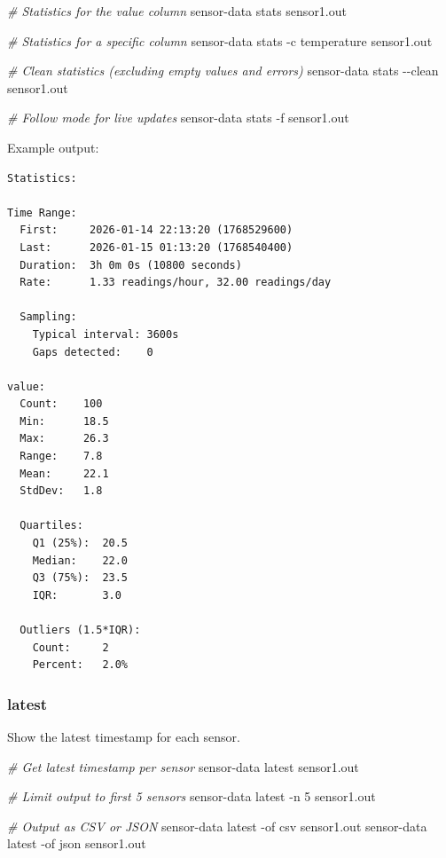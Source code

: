 \documentclass[
]{book}
\newenvironment{Shaded}{\begin{snugshade}}{\end{snugshade}}
\newcommand{\AttributeTok}[1]{\textcolor[rgb]{0.13,0.29,0.53}{#1}}
\newcommand{\CommentTok}[1]{\textcolor[rgb]{0.56,0.35,0.01}{\textit{#1}}}
\newcommand{\ExtensionTok}[1]{#1}
\newcommand{\NormalTok}[1]{#1}
\begin{document}
\begin{Shaded}
\begin{Highlighting}[]
\CommentTok{\# Statistics for the \textquotesingle{}value\textquotesingle{} column}
\ExtensionTok{sensor{-}data}\NormalTok{ stats sensor1.out}

\CommentTok{\# Statistics for a specific column}
\ExtensionTok{sensor{-}data}\NormalTok{ stats }\AttributeTok{{-}c}\NormalTok{ temperature sensor1.out}

\CommentTok{\# Clean statistics (excluding empty values and errors)}
\ExtensionTok{sensor{-}data}\NormalTok{ stats }\AttributeTok{{-}{-}clean}\NormalTok{ sensor1.out}

\CommentTok{\# Follow mode for live updates}
\ExtensionTok{sensor{-}data}\NormalTok{ stats }\AttributeTok{{-}f}\NormalTok{ sensor1.out}
\end{Highlighting}
\end{Shaded}

Example output:

\begin{verbatim}
Statistics:

Time Range:
  First:     2026-01-14 22:13:20 (1768529600)
  Last:      2026-01-15 01:13:20 (1768540400)
  Duration:  3h 0m 0s (10800 seconds)
  Rate:      1.33 readings/hour, 32.00 readings/day

  Sampling:
    Typical interval: 3600s
    Gaps detected:    0

value:
  Count:    100
  Min:      18.5
  Max:      26.3
  Range:    7.8
  Mean:     22.1
  StdDev:   1.8

  Quartiles:
    Q1 (25%):  20.5
    Median:    22.0
    Q3 (75%):  23.5
    IQR:       3.0

  Outliers (1.5*IQR):
    Count:     2
    Percent:   2.0%
\end{verbatim}

\subsubsection{latest}\label{latest}

Show the latest timestamp for each sensor.

\begin{Shaded}
\begin{Highlighting}[]
\CommentTok{\# Get latest timestamp per sensor}
\ExtensionTok{sensor{-}data}\NormalTok{ latest sensor1.out}

\CommentTok{\# Limit output to first 5 sensors}
\ExtensionTok{sensor{-}data}\NormalTok{ latest }\AttributeTok{{-}n}\NormalTok{ 5 sensor1.out}

\CommentTok{\# Output as CSV or JSON}
\ExtensionTok{sensor{-}data}\NormalTok{ latest }\AttributeTok{{-}of}\NormalTok{ csv sensor1.out}
\ExtensionTok{sensor{-}data}\NormalTok{ latest }\AttributeTok{{-}of}\NormalTok{ json sensor1.out}
\end{Highlighting}
\end{Shaded}
\end{document}

